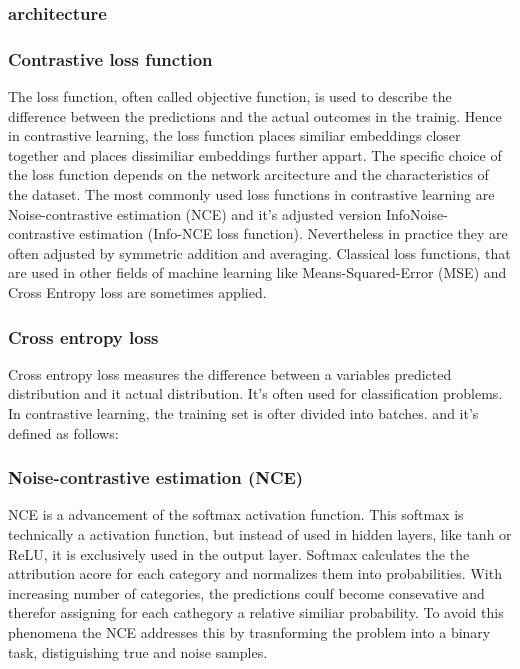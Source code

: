 \subsubsection{architecture}


\subsubsection{Contrastive loss function}
The loss function, often called objective function, is used to describe the difference between the predictions and the actual outcomes in the trainig. 
Hence in contrastive learning, the loss function places similiar embeddings closer together and places dissimiliar embeddings further appart.
The specific choice of the loss function depends on the network arcitecture and the characteristics of the dataset. 
The most commonly used loss functions in contrastive learning are Noise-contrastive estimation (NCE) and it's adjusted version InfoNoise-contrastive estimation (Info-NCE loss function).
Nevertheless in practice they are often adjusted by symmetric addition and averaging.
Classical loss functions, that are used in other fields of machine learning like Means-Squared-Error (MSE) and Cross Entropy loss are sometimes applied.

\subsubsection{Cross entropy loss}
Cross entropy loss measures the difference between a variables predicted distribution and it actual distribution.
It's often used for classification problems.
In contrastive learning, the training set is ofter divided into batches.
and it's defined as follows: 

\subsubsection{Noise-contrastive estimation (NCE)}
NCE is a advancement of the softmax activation function. 
This softmax is technically a activation function, but instead of used in hidden layers, like tanh or ReLU, it is exclusively used in the output layer.
Softmax calculates the the attribution acore for each category and normalizes them into probabilities. 
With increasing number of categories, the predictions coulf become consevative and therefor assigning for each cathegory a relative similiar probability.
To avoid this phenomena the NCE addresses this by trasnforming the problem into a binary task, distiguishing true and noise samples. 

